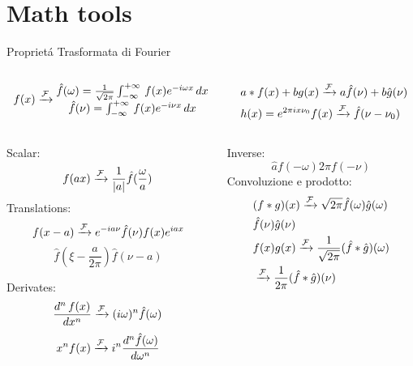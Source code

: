 \section{Math tools}\label{sec:math}

\begin{wordonframe}{Propriet\'a Trasformata di Fourier}
\begin{columns}
\begin{column}{0.5\textwidth}
\begin{align*}
f(x)\xrightarrow{\mathcal{F}}{}\begin{matrix}
\hat{f}(\omega)=\frac{1}{\sqrt{2\pi}}\int_{-\infty}^{+\infty}\,f(x)e^{-i\omega x}\,dx\\
\hat{f}(\nu)=\int_{-\infty}^{+\infty}\,f(x)e^{-i\nu x}\,dx\\
\end{matrix}
\end{align*}
\end{column}

\begin{column}{0.5\textwidth}
\begin{align*}
&a*f(x)+bg(x)\xrightarrow{\mathcal{F}}{}a\hat{f}(\nu)+b\hat{g}(\nu)\\
&h(x)=e^{2\pi ix\nu_0}f(x)\xrightarrow{\mathcal{F}}{}\hat{f}(\nu-\nu_0)
\end{align*}
\end{column}
\end{columns}

\begin{columns}
\begin{column}{0.5\textwidth}
Scalar: \[f(ax)\xrightarrow{\mathcal{F}}{}\frac{1}{|a|}\hat{f}(\frac{\omega}{a}) \]
Translations:
\[f(x-a)\xrightarrow{\mathcal{F}}{}e^{-ia\nu}\hat{f}(\nu)f(x)e^{iax}\]
\[\hat{f}(\xi-\frac{a}{2\pi}) \hat{f}(\nu-a)\]

Derivates:
\[\frac{d^n\,f(x)}{dx^n}\xrightarrow{\mathcal{F}}{}(i\omega)^n\hat{f}(\omega)\]
\[x^nf(x)\xrightarrow{\mathcal{F}}{}i^n\frac{d^n\hat{f}(\omega)}{d\omega^n}\]
\end{column}
\begin{column}{0.5\textwidth}
Inverse: \[\hat{a} f(-\omega) 2\pi f(-\nu)\]
Convoluzione e prodotto:
\begin{align*}
&(f*g)(x)\xrightarrow{\mathcal{F}}{}\sqrt{2\pi}\hat{f}(\omega)\hat{g}(\omega)\\
&\hat{f}(\nu)\hat{g}(\nu)\\
&f(x)g(x)\xrightarrow{\mathcal{F}}{}\frac{1}{\sqrt{2\pi}}(\hat{f}*\hat{g})(\omega)\\
&\xrightarrow{\mathcal{F}}{}\frac{1}{2\pi}(\hat{f}*\hat{g})(\nu)
\end{align*}

\end{column}
\end{columns}
\end{wordonframe}


